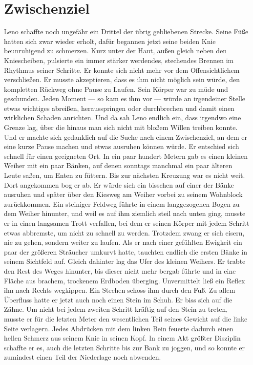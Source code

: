 \documentclass[ngerman,smalldemyvopaper,11pt,oneside,onecolumn,openright,extrafontsizes]{memoir}
\begin{document}
\chapter{Zwischenziel}
Leno schaffte noch ungefähr ein Drittel der übrig gebliebenen Strecke. Seine Füße hatten sich zwar wieder erholt, dafür begannen jetzt seine beiden Knie beunruhigend zu schmerzen. Kurz unter der Haut, außen gleich neben den Kniescheiben, pulsierte ein immer stärker werdendes, stechendes Brennen im Rhythmus seiner Schritte. Er konnte sich nicht mehr vor dem Offensichtlichem verschließen. Er musste akzeptieren, dass es ihm nicht möglich sein würde, den kompletten Rückweg ohne Pause zu Laufen. Sein Körper war zu müde und geschunden. Jeden Moment — so kam es ihm vor — würde an irgendeiner Stelle etwas wichtiges abreißen, herausspringen oder durchbrechen und damit einen wirklichen Schaden anrichten. Und da sah Leno endlich ein, dass irgendwo eine Grenze lag, über die hinaus man sich nicht mit bloßem Willen treiben konnte. Und er machte sich gedanklich auf die Suche nach einem Zwischenziel, an dem er eine kurze Pause machen und etwas ausruhen können würde.
Er entschied sich schnell für einen geeigneten Ort. In ein paar hundert Metern gab es einen kleinen Weiher mit ein paar Bänken, auf denen sonntags manchmal ein paar älteren Leute saßen, um Enten zu füttern. Bis zur nächsten Kreuzung war es nicht weit. Dort angekommen bog er ab. Er würde sich ein bisschen auf einer der Bänke ausruhen und später über den Kiesweg am Weiher vorbei zu seinem Wohnblock zurückkommen. Ein steiniger Feldweg führte in einem langgezogenen Bogen zu dem Weiher hinunter, und weil es auf ihm ziemlich steil nach unten ging, musste er in einen langsamen Trott verfallen, bei dem er seinen Körper mit jedem Schritt etwas abbremste, um nicht zu schnell zu werden. Trotzdem zwang er sich eisern, nie zu gehen, sondern weiter zu laufen. Als er nach einer gefühlten Ewigkeit ein paar der größeren Sträucher umkurvt hatte, tauchten endlich die ersten Bänke in seinem Sichtfeld auf. Gleich dahinter lag das Ufer des kleinen Weihers. Er trabte den Rest des Weges hinunter, bis dieser nicht mehr bergab führte und in eine Fläche aus brachem, trockenem Erdboden überging. Unvermittelt ließ ein Reflex ihn nach Rechts wegkippen. Ein Stechen schoss ihm durch den Fuß. Zu allem Überfluss hatte er jetzt auch noch einen Stein im Schuh. Er biss sich auf die Zähne. Um nicht bei jedem zweiten Schritt kräftig auf den Stein zu treten, musste er für die letzten Meter den wesentlichen Teil seines Gewicht auf die linke Seite verlagern. Jedes Abdrücken mit dem linken Bein feuerte dadurch einen hellen Schmerz aus seinem Knie in seinen Kopf. In einem Akt größter Disziplin schaffte er es, auch die letzten Schritte bis zur Bank zu joggen, und so konnte er zumindest einen Teil der Niederlage noch abwenden.
\end{document}
